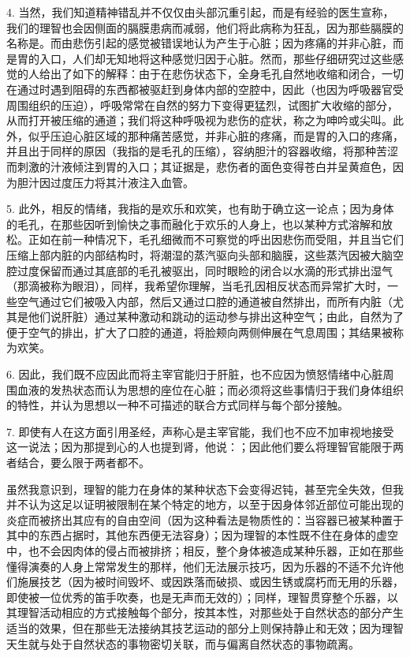 4. 当然，我们知道精神错乱并不仅仅由头部沉重引起，而是有经验的医生宣称，我们的理智也会因侧面的膈膜患病而减弱，他们将此病称为狂乱，因为那些膈膜的名称是。而由悲伤引起的感觉被错误地认为产生于心脏；因为疼痛的并非心脏，而是胃的入口，人们却无知地将这种感觉归因于心脏。然而，那些仔细研究过这些感觉的人给出了如下的解释：由于在悲伤状态下，全身毛孔自然地收缩和闭合，一切在通过时遇到阻碍的东西都被驱赶到身体内部的空腔中，因此（也因为呼吸器官受周围组织的压迫），呼吸常常在自然的努力下变得更猛烈，试图扩大收缩的部分，从而打开被压缩的通道；我们将这种呼吸视为悲伤的症状，称之为呻吟或尖叫。此外，似乎压迫心脏区域的那种痛苦感觉，并非心脏的疼痛，而是胃的入口的疼痛，并且出于同样的原因（我指的是毛孔的压缩），容纳胆汁的容器收缩，将那种苦涩而刺激的汁液倾注到胃的入口；其证据是，悲伤者的面色变得苍白并呈黄疸色，因为胆汁因过度压力将其汁液注入血管。\par

5. 此外，相反的情绪，我指的是欢乐和欢笑，也有助于确立这一论点；因为身体的毛孔，在那些因听到愉快之事而融化于欢乐的人身上，也以某种方式溶解和放松。正如在前一种情况下，毛孔细微而不可察觉的呼出因悲伤而受阻，并且当它们压缩上部内脏的内部结构时，将潮湿的蒸汽驱向头部和脑膜，这些蒸汽因被大脑空腔过度保留而通过其底部的毛孔被驱出，同时眼睑的闭合以水滴的形式排出湿气（那滴被称为眼泪），同样，我希望你理解，当毛孔因相反状态而异常扩大时，一些空气通过它们被吸入内部，然后又通过口腔的通道被自然排出，而所有内脏（尤其是他们说肝脏）通过某种激动和跳动的运动参与排出这种空气；由此，自然为了便于空气的排出，扩大了口腔的通道，将脸颊向两侧伸展在气息周围；其结果被称为欢笑。\par

6. 因此，我们既不应因此而将主宰官能归于肝脏，也不应因为愤怒情绪中心脏周围血液的发热状态而认为思想的座位在心脏；而必须将这些事情归于我们身体组织的特性，并认为思想以一种不可描述的联合方式同样与每个部分接触。\par

7. 即使有人在这方面引用圣经，声称心是主宰官能，我们也不应不加审视地接受这一说法；因为那提到心的人也提到肾，他说：；因此他们要么将理智官能限于两者结合，要么限于两者都不。\par

虽然我意识到，理智的能力在身体的某种状态下会变得迟钝，甚至完全失效，但我并不认为这足以证明被限制在某个特定的地方，以至于因身体邻近部位可能出现的炎症而被挤出其应有的自由空间（因为这种看法是物质性的：当容器已被某种置于其中的东西占据时，其他东西便无法容身）；因为理智的本性既不住在身体的虚空中，也不会因肉体的侵占而被排挤；相反，整个身体被造成某种乐器，正如在那些懂得演奏的人身上常常发生的那样，他们无法展示技巧，因为乐器的不适不允许他们施展技艺（因为被时间毁坏、或因跌落而破损、或因生锈或腐朽而无用的乐器，即使被一位优秀的笛手吹奏，也是无声而无效的）；同样，理智贯穿整个乐器，以其理智活动相应的方式接触每个部分，按其本性，对那些处于自然状态的部分产生适当的效果，但在那些无法接纳其技艺运动的部分上则保持静止和无效；因为理智天生就与处于自然状态的事物密切关联，而与偏离自然状态的事物疏离。\par

